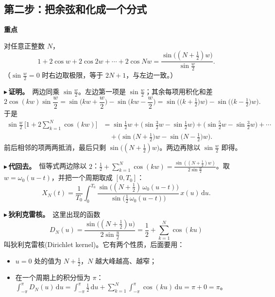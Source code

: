 \documentclass[UTF8,a4paper,11pt]{ctexart}
\newenvironment{remember}{\begin{rememberbox}\textbf{重点}\par\smallskip}{\end{rememberbox}}
\newcounter{ex}[section]
\newcommand{\point}[1]{\par\addvspace{1ex}\noindent\textcolor{ptteal}{$\blacktriangleright$\,\textbf{#1}}\ }
\begin{document}
\subsection{第二步：把余弦和化成一个分式}\label{sub:kernel}
\begin{remember}
对任意正整数 $N$，
\[
1+2\cos w+2\cos 2w+\cdots+2\cos Nw=\frac{\sin\!\big((N+\frac12)w\big)}{\sin\frac{w}{2}} .
\]
（$\sin\frac w2=0$ 时右边取极限，等于 $2N+1$，与左边一致。）
\end{remember}

\point{证明。}两边同乘 $\sin\frac w2$。左边第一项是 $\sin\frac w2$；其余每项用积化和差
\[
2\cos(kw)\sin\frac w2=\sin\!\Big(kw+\frac w2\Big)-\sin\!\Big(kw-\frac w2\Big)=\sin\!\Big(\big(k+\tfrac12\big)w\Big)-\sin\!\Big(\big(k-\tfrac12\big)w\Big).
\]
于是
\begin{align*}
\sin\frac w2\,\Big[1+2\sum_{k=1}^{N}\cos(kw)\Big]
&=\sin\frac12w+\Big(\sin\frac32w-\sin\frac12w\Big)+\Big(\sin\frac52w-\sin\frac32w\Big)+\cdots\\
&\quad+\Big(\sin\big(N+\tfrac12\big)w-\sin\big(N-\tfrac12\big)w\Big).
\end{align*}
前后相邻的项两两抵消，最后只剩 $\sin\big((N+\frac12)w\big)$。两边再除以 $\sin\frac w2$ 即得。

\point{代回去。}恒等式两边除以 $2$：$\frac12+\sum_{k=1}^{N}\cos(kw)=\frac{\sin((N+\frac12)w)}{2\sin\frac w2}$。取 $w=\omega_0(u-t)$，并把一个周期取成 $[0,T_0]$：
\[
X_N(t)=\frac{1}{T_0}\int_{0}^{T_0}\frac{\sin\!\big((N+\frac12)\,\omega_0(u-t)\big)}{\sin\!\big(\frac12\,\omega_0(u-t)\big)}\,x(u)\,\mathrm{d}u .
\]

\point{狄利克雷核。}这里出现的函数
\[
D_N(u)=\frac{\sin\!\big((N+\frac12)u\big)}{2\sin\frac u2}=\frac12+\sum_{k=1}^{N}\cos(ku)
\]
叫狄利克雷核(Dirichlet kernel)。它有两个性质，后面要用：
\begin{itemize}[nosep]
\item $u=0$ 处的值为 $N+\frac12$，$N$ 越大峰越高、越窄；
\item 在一个周期上的积分恒为 $\pi$：$\int_{-\pi}^{\pi}D_N(u)\,\mathrm{d}u=\int_{-\pi}^{\pi}\frac12\,\mathrm{d}u+\sum_{k=1}^{N}\int_{-\pi}^{\pi}\cos(ku)\,\mathrm{d}u=\pi+0=\pi$。
\end{itemize}
\end{document}
